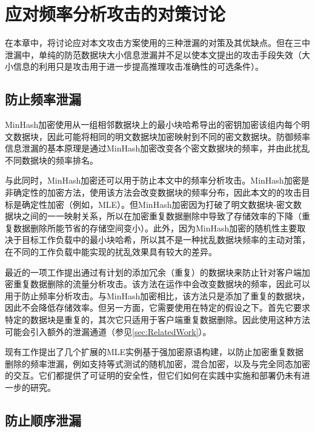 \chapter{应对频率分析攻击的对策讨论}
\label{sec:Countermeasure}

在本章中，将讨论应对本文攻击方案使用的三种泄漏的对策及其优缺点。但在三中泄漏中，单纯的防范数据块大小信息泄漏并不足以使本文提出的攻击手段失效（大小信息的利用只是攻击用于进一步提高推理攻击准确性的可选条件）。

\section{防止频率泄漏}

MinHash加密使用从一组相邻数据块上的最小块哈希导出的密钥加密该组内每个明文数据块，因此可能将相同的明文数据块加密映射到不同的密文数据块。防御频率信息泄漏的基本原理是通过MinHash加密改变各个密文数据块的频率，并由此扰乱不同数据块的频率排名。

与此同时，MinHash加密还可以用于防止本文中的频率分析攻击。MinHash加密是非确定性的加密方法，使用该方法会改变数据块的频率分布，因此本文的的攻击目标是确定性加密（例如，MLE）。但MinHash加密因为打破了明文数据块-密文数据块之间的一一映射关系，所以在加密重复数据删除中导致了存储效率的下降（重复数据删除所能节省的存储空间变小）。此外，因为MinHash加密的随机性主要取决于目标工作负载中的最小块哈希，所以其不是一种扰乱数据块频率的主动对策，在不同的工作负载中能实现的扰乱效果具有较大的差异。         

最近的一项工作提出通过有计划的添加冗余（重复）的数据块来防止针对客户端加密重复数据删除的流量分析攻击。该方法在运作中会改变数据块的频率，因此可以用于防止频率分析攻击。与MinHash加密相比，该方法只是添加了重复的数据块，因此不会降低存储效率。但另一方面，它需要使用在特定的假设之下。首先它要求特定的数据块是重复的，其次它只适用于客户端重复数据删除。因此使用这种方法可能会引入额外的泄漏通道（参见\ref{sec:RelatedWork}）。

现有工作提出了几个扩展的MLE实例基于强加密原语构建，以防止加密重复数据删除的频率泄漏，例如支持等式测试的随机加密，混合加密，以及与完全同态加密的交互。它们都提供了可证明的安全性，但它们如何在实践中实施和部署仍未有进一步的研究。

\section{防止顺序泄漏} 

